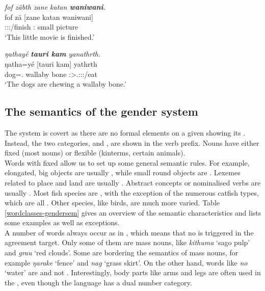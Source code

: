 \begin{exe}
	\ex \emph{fof zäbth zane katan \textbf{waniwani}.}\\
	\gll fof zä [zane katan waniwani]\\
	\Emph{} \Stsg:\Sbj:\Rpst:\Pfv/finish \Dem:\Prox{} small {picture}\\
	\trans `This little movie is finished.'
	\label{ex046}
\end{exe}
\begin{exe}
	\ex \emph{ŋathayé \textbf{tauri kam} yanathrth.}\\
	\gll ŋatha=yé [tauri kam] yathrth\\
	dog=\Erg.\Nsg{} wallaby bone \Stpl:\Sbj>\Tsg.\Masc:\Obj:\Nonpast:\Ipfv/eat\\
	\trans `The dogs are chewing a wallaby bone.'
	\label{ex047}
\end{exe}

\subsection{The semantics of the gender system}\label{wordclasses-thegendersystem}

The  system is covert as there are no formal elements on a given  showing its . Instead, the two categories,  and , are shown in the verb prefix. Nouns have either fixed  (most nouns) or flexible  (kinterms, certain animals).\\

Words with fixed  allow us to set up some general semantic rules. For example, elongated, big objects are usually , while small round objects are . Lexemes related to place and land are usually . Abstract concepts or nominalised verbs are usually . Most fish species are , with the exception of the numerous catfish types, which are all . Other species, like birds, are much more varied. Table \ref{wordclasses-gendersem} gives an overview of the semantic characteristics and lists some examples as well as exceptions.\\

A number of words always occur as in , which means that no  is triggered in the agreement target. Only some of them are mass nouns, like \emph{kithuma} `sago pulp' and \emph{grau} `red clouds'. Some are bordering the semantics of mass nouns, for example \emph{ŋarake} `fence' and \emph{nag} `grass skirt'. On the other hand, words like \emph{no} `water' are  and not . Interestingly, body parts like arms and legs are often used in the , even though the language has a dual number category.\\

